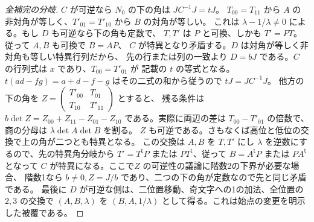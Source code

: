 \begin{proof}[全補完の分岐]
$C$ が可逆なら $N_0$ の下の角は $JC^{-1}J=tJ$。
$T_{00}=T_{11}$ から $A$ の非対角が等しく、$T'_{01}=T'_{10}$ から $B$ の対角が等しい。
これは $\lambda-1/\lambda\ne0$ による。もし $D$ も可逆なら下の角も定数で、
$T,T'$ は $P$ と可換、しかも $T'=PT$。従って $A,B$ も可換で $B=AP$、
$C$ が特異となり矛盾する。$D$ は対角が等しく非対角も等しい特異行列だから、
先の行または列の一致より $D=bJ$ である。$C$ の行列式は $x$ であり、$T_{00}=T'_{01}$ が
記載の $t$ の等式となる。$t(ad-fg)=a+d-f-g$ はその二式の和から従うので $tJ=JC^{-1}J$。
他方の下の角を $Z=\left(\begin{smallmatrix}T'_{00}&T_{01}\\T_{10}&T'_{11}\end{smallmatrix}\right)$ とすると、
残る条件は $b\det Z=Z_{00}+Z_{11}-Z_{01}-Z_{10}$ である。実際に両辺の差は
$T_{00}-T'_{01}$ の倍数で、商の分母は $\lambda\det A\det B$ を割る。
$Z$ も可逆である。さもなくば高位と低位の交換で上の角が二つとも特異となる。
この交換は $A,B$ を $T,T'$ にし $\lambda$ を逆数にするので、先の特異角分岐から
$T'=T^{\mathsf t}P$ または $PT^{\mathsf t}$、従って $B=A^{\mathsf t}P$ または $PA^{\mathsf t}$
となって $C$ が特異になる。ここで$Z$ の可逆性の議論に階数2の下界が必要な場合、
階数1なら $b\ne0,Z=J/b$ であり、二つの下の角が定数なので先と同じ矛盾である。
最後に $D$ が可逆な側は、二位置移動、奇文字への1の加法、全位置の $2,3$ の交換で
$(A,B,\lambda)$ を $(B,A,1/\lambda)$ として得る。これは始点の変更を明示した被覆である。
\end{proof}

